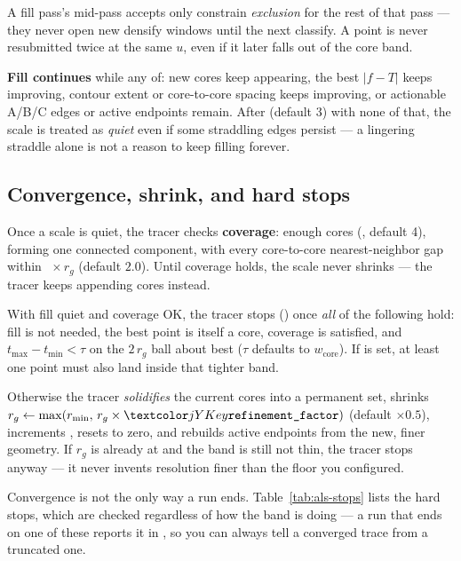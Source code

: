 A fill pass's mid-pass accepts only constrain \emph{exclusion} for the rest of that pass
--- they never open new densify windows until the next classify. A point is never
resubmitted twice at the same $u$, even if it later falls out of the core band.

\textbf{Fill continues} while any of: new cores keep appearing, the best
$\lvert f-T\rvert$ keeps improving, contour extent or core-to-core spacing keeps
improving, or actionable A/B/C edges or active endpoints remain. After
 (default 3) with none of that, the scale is treated as
\emph{quiet} even if some straddling edges persist --- a lingering straddle alone is not
a reason to keep filling forever.

\subsection{Convergence, shrink, and hard stops}

Once a scale is quiet, the tracer checks \textbf{coverage}: enough cores
(, default 4), forming one connected component, with
every core-to-core nearest-neighbor gap within
~$\times\,r_g$ (default $2.0$). Until coverage holds, the
scale never shrinks --- the tracer keeps appending cores instead.

With fill quiet and coverage OK, the tracer stops () once
\emph{all} of the following hold: fill is not needed, the best point is itself a core,
coverage is satisfied, and $t_{\max}-t_{\min} < \tau$ on the $2\,r_g$ ball about best
($\tau$ defaults to $w_{\mathrm{core}}$). If  is set, at
least one point must also land inside that tighter band.

Otherwise the tracer \emph{solidifies} the current cores into a permanent set, shrinks
$r_g \leftarrow \max(r_{\min},\, r_g \times \yamlkey{refinement\_factor})$ (default
$\times 0.5$), increments , resets  to zero, and
rebuilds active endpoints from the new, finer geometry. If $r_g$ is already at
 and the band is still not thin, the tracer stops anyway --- it
never invents resolution finer than the floor you configured.

Convergence is not the only way a run ends. Table~\ref{tab:als-stops} lists the hard
stops, which are checked regardless of how the band is doing --- a run that ends on one
of these reports it in , so you can always tell a converged trace from
a truncated one.

